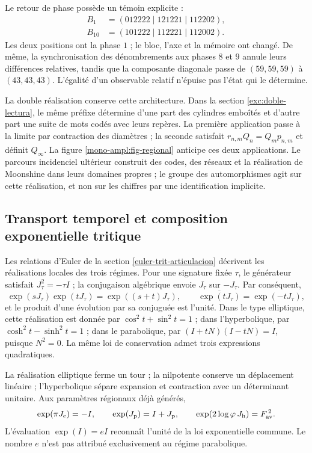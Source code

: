 Le retour de phase possède un témoin explicite :
\[
 \begin{aligned}
 B_1&=(012222\mid121221\mid112202),\\
 B_{10}&=(101222\mid112221\mid112002).
 \end{aligned}
\]
Les deux positions ont la phase \(1\) ; le bloc, l'axe et la mémoire ont
changé. De même, la synchronisation des dénombrements aux phases \(8\) et
\(9\) annule leurs différences relatives, tandis que la composante diagonale
passe de \((59,59,59)\) à \((43,43,43)\). L'égalité d'un observable
relatif n'épuise pas l'état qui le détermine.

La double réalisation conserve cette architecture. Dans la section
\ref{exc:doble-lectura}, le même préfixe détermine d'une part des cylindres
emboîtés et d'autre part une suite de mots codés avec leurs repères.
La première application passe à la limite par contraction des diamètres ; la seconde
satisfait \(r_{n,m}Q_n=Q_mp_{n,m}\) et définit \(Q_\infty\).
La figure \ref{mono-ampl:fig-regional} anticipe ces deux applications.
Le parcours incidenciel ultérieur construit des codes, des réseaux et la
réalisation de Moonshine dans leurs domaines propres ; le groupe des automorphismes
agit sur cette réalisation, et non sur les chiffres par une identification
implicite.





\subsection{Transport temporel et composition exponentielle tritique}
\label{mono-ampl:euler}

Les relations d'Euler de la section \ref{euler-trit-articulacion}
décrivent les réalisations locales des trois régimes. Pour une signature
fixée \(\tau\), le générateur satisfait \(J_\tau^2=-\tau I\) ;
la conjugaison algébrique envoie \(J_\tau\) sur \(-J_\tau\). Par conséquent,
\[
 \exp(sJ_\tau)\exp(tJ_\tau)=\exp((s+t)J_\tau),\qquad
 \overline{\exp(tJ_\tau)}=\exp(-tJ_\tau),
\]
et le produit d'une évolution par sa conjuguée est l'unité. Dans le type
elliptique, cette réalisation est donnée par \(\cos^2t+\sin^2t=1\) ; dans l'hyperbolique,
par \(\cosh^2t-\sinh^2t=1\) ; dans le parabolique,
par \((I+tN)(I-tN)=I\), puisque \(N^2=0\). La même loi de conservation
admet trois expressions quadratiques.

La réalisation elliptique ferme un tour ; la nilpotente conserve un
déplacement linéaire ; l'hyperbolique sépare expansion et contraction avec
un déterminant unitaire. Aux paramètres régionaux déjà générés,
\[
 \exp(\pi J_{\mathrm e})=-I,\qquad
 \exp(J_{\mathrm p})=I+J_{\mathrm p},\qquad
 \exp(2\log\varphi\,J_{\mathrm h})=F_{\rm av}^{\,2}.
\]
L'évaluation \(\exp(I)=eI\) reconnaît l'unité de la loi exponentielle
commune. Le nombre \(e\) n'est pas attribué exclusivement au régime parabolique.

